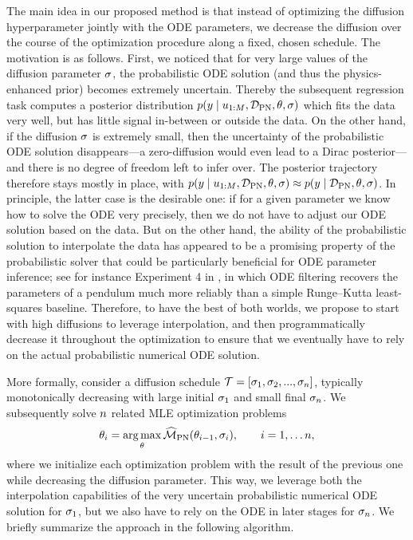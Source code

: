 \documentclass{mimosis}
\begin{document}
The main idea in our proposed method is that instead of optimizing the diffusion hyperparameter jointly with the ODE parameters, we decrease the diffusion over the course of the optimization procedure along a fixed, chosen schedule.
The motivation is as follows.
First, we noticed that for very large values of the diffusion parameter \(\sigma\), the probabilistic ODE solution (and thus the physics-enhanced prior) becomes extremely uncertain.
Thereby the subsequent regression task computes a posterior distribution
\(\p( \val \mid \oobs_{1:M}, \data_\text{PN}, \theta, \sdiff)\)
which fits the data very well, but has little signal in-between or outside the data.
On the other hand, if the diffusion \(\sigma\) is extremely small, then the uncertainty of the probabilistic ODE solution disappears---a zero-diffusion would even lead to a Dirac posterior---and there is no degree of freedom left to infer over.
The posterior trajectory therefore stays mostly in place, with
\(\p( \val \mid \oobs_{1:M}, \data_\text{PN}, \theta, \sdiff) \approx \p( \val \mid \data_\text{PN}, \theta, \sdiff)\).
In principle, the latter case is the desirable one: if for a given parameter we know how to solve the ODE very precisely, then we do not have to adjust our ODE solution based on the data.
But on the other hand, the ability of the probabilistic solution to interpolate the data has appeared to be a promising property of the probabilistic solver that could be particularly beneficial for ODE parameter inference;
see for instance Experiment 4 in
\fenrir{}, in which ODE filtering recovers the parameters of a pendulum much more reliably than a simple Runge--Kutta least-squares baseline.
Therefore, to have the best of both worlds, we propose to start with high diffusions to leverage interpolation, and then programmatically decrease it throughout the optimization to ensure that we eventually have to rely on the actual probabilistic numerical ODE solution.

More formally, consider a diffusion schedule
\(\mathcal{T}=[\sigma_1, \sigma_2, ..., \sigma_n]\),
typically monotonically decreasing with large initial \(\sigma_1\) and small final \(\sigma_n\).
We subsequently solve \(n\) related MLE optimization problems
\begin{equation}
    \theta_{i} = \argmax_\theta \PNML \left( \theta_{i-1}, \sdiff_i \right),
    \qquad i=1, \dots \numtemperingsteps,
\end{equation}
where we initialize each optimization problem with the result of the previous one while decreasing the diffusion parameter.
This way, we leverage both the interpolation capabilities of the very uncertain probabilistic numerical ODE solution for \(\sigma_1\), but we also have to rely on the ODE in later stages for \(\sigma_n\).
We briefly summarize the approach in the following algorithm.
\end{document}
